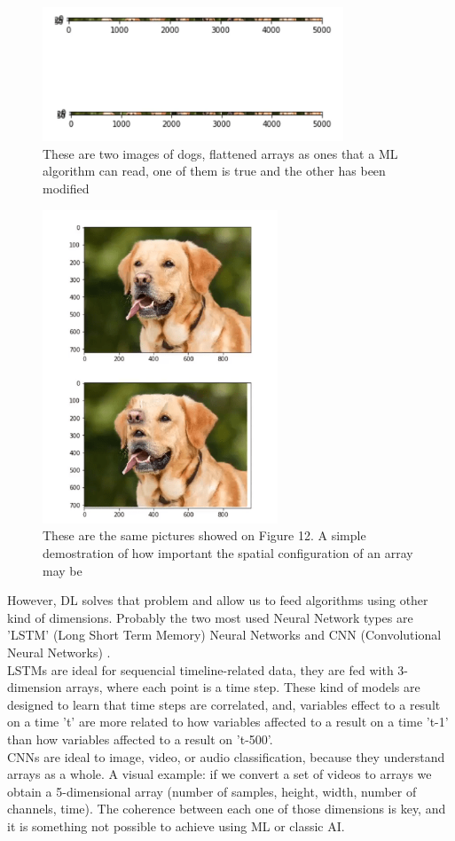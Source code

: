 \documentclass[openany]{article}
\begin{document}
\begin{figure}[!h]
    \centering
    \includegraphics[width=0.8\textwidth]{FlattenedImage.png}
    \caption{These are two images of dogs, flattened arrays as ones that a ML algorithm can read, one of them is true and the other has been modified}
    \label{fig:my_label}
\end{figure}

\begin{figure}[!h]
    \centering
    \includegraphics[width=7cm]{NonFlattenedDog.png}
    \caption{These are the same pictures showed on Figure 12. A simple demostration of how important the spatial configuration of an array may be}
    \label{fig:my_label}
\end{figure}


However, DL solves that problem and allow us to feed algorithms using other kind of dimensions. Probably the two most used Neural Network types are 'LSTM' (Long Short Term Memory) Neural Networks \cite{LSTM} and CNN (Convolutional Neural Networks) \cite{DBLP:journals/corr/OSheaN15}. \\
LSTMs are ideal for sequencial timeline-related data, they are fed with 3-dimension arrays, where each point is a time step. These kind of models are designed to learn that time steps are correlated, and, variables effect to a result on a time 't' are more related to how variables affected to a result on a time 't-1' than how variables affected to a result on 't-500'. \\
CNNs are ideal to image, video, or audio classification, because they understand arrays as a whole. A visual example: if we convert a set of videos to arrays we obtain a 5-dimensional array (number of samples, height, width, number of channels, time). The coherence between each one of those dimensions is key, and it is something not possible to achieve using ML or classic AI.
\end{document}
